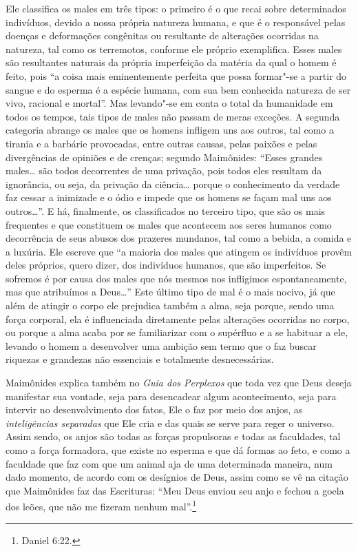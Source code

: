 Ele classifica os males em três tipos: o primeiro é o que recai sobre
determinados indivíduos, devido a nossa própria natureza humana, e que é
o responsável pelas doenças e deformações congênitas ou resultante de
alterações ocorridas na natureza, tal como os terremotos, conforme ele
próprio exemplifica. Esses males são resultantes naturais da própria
imperfeição da matéria da qual o homem é feito, pois ``a coisa mais
eminentemente perfeita que possa formar"-se a partir do sangue e do
esperma é a espécie humana, com sua bem conhecida natureza de ser vivo,
racional e mortal''. Mas levando"-se em conta o total da humanidade em
todos os tempos, tais tipos de males não passam de meras exceções. A
segunda categoria abrange os males que os homens infligem uns aos
outros, tal como a tirania e a barbárie provocadas, entre outras causas,
pelas paixões e pelas divergências de opiniões e de crenças; segundo
Maimônides: ``Esses grandes males\ldots{} são todos decorrentes de uma
privação, pois todos eles resultam da ignorância, ou seja, da privação
da ciência\ldots{} porque o conhecimento da verdade faz cessar a inimizade
e o ódio e impede que os homens se façam mal uns aos outros\ldots{}''. E há,
finalmente, os classificados no terceiro tipo, que são os mais
frequentes e que constituem os males que acontecem aos seres humanos
como decorrência de seus abusos dos prazeres mundanos, tal como a
bebida, a comida e a luxúria. Ele escreve que ``a maioria dos males que
atingem os indivíduos provêm deles próprios, quero dizer, dos indivíduos
humanos, que são imperfeitos. Se sofremos é por causa dos males que nós
mesmos nos infligimos espontaneamente, mas que atribuímos a Deus\ldots{}''
Este último tipo de mal é o mais nocivo, já que além de atingir o corpo
ele prejudica também a alma, seja porque, sendo uma força corporal, ela
é influenciada diretamente pelas alterações ocorridas no corpo, ou
porque a alma acaba por se familiarizar com o supérfluo e a se habituar
a ele, levando o homem a desenvolver uma ambição sem termo que o faz
buscar riquezas e grandezas não essenciais e totalmente desnecessárias.

Maimônides explica também no \emph{Guia dos Perplexos} que toda vez que
Deus deseja manifestar sua vontade, seja para desencadear algum
acontecimento, seja para intervir no desenvolvimento dos fatos, Ele o
faz por meio dos anjos, as \emph{inteligências separadas} que Ele cria e
das quais se serve para reger o universo. Assim sendo, os anjos são
todas as forças propulsoras e todas as faculdades, tal como a força
formadora, que existe no esperma e que dá formas ao feto, e como a faculdade 
que faz com que um animal aja de uma
determinada maneira, num dado momento, de acordo com os desígnios de
Deus, assim como se vê na citação que Maimônides faz das Escrituras:
``Meu Deus enviou seu anjo e fechou a goela dos leões, que não me
fizeram nenhum mal''.\footnote{Daniel 6:22.}


